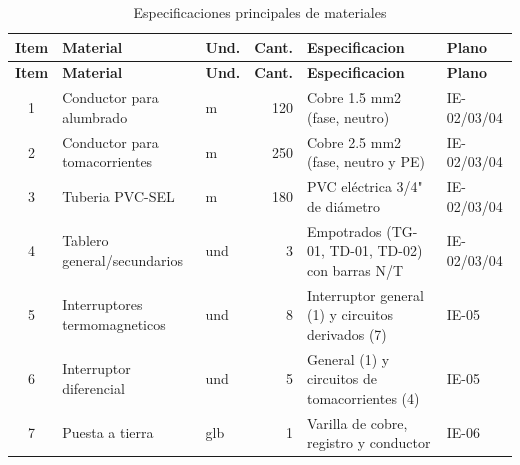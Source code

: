 \begin{landscape}
{\scriptsize
\setlength{\tabcolsep}{3pt}
\begin{longtable}{c L{3.0cm}L{1.0cm}r L{3.4cm}L{1.4cm}}
\caption{Especificaciones principales de materiales}\label{tab:especificaciones-materiales}\\
\toprule
\textbf{Item} & \textbf{Material} & \textbf{Und.} & \textbf{Cant.} & \textbf{Especificacion} & \textbf{Plano} \\
\midrule
\endfirsthead
\toprule
\textbf{Item} & \textbf{Material} & \textbf{Und.} & \textbf{Cant.} & \textbf{Especificacion} & \textbf{Plano} \\
\midrule
{} & Conductor para alumbrado & m & 120 & Cobre 1.5 mm2 (fase, neutro) & IE-02/03/04 \\
2 & Conductor para tomacorrientes & m & 250 & Cobre 2.5 mm2 (fase, neutro y PE) & IE-02/03/04 \\
3 & Tuberia PVC-SEL & m & 180 & PVC eléctrica 3/4" de diámetro & IE-02/03/04 \\
4 & Tablero general/secundarios & und & 3 & Empotrados (TG-01, TD-01, TD-02) con barras N/T & IE-02/03/04 \\
5 & Interruptores termomagneticos & und & 8 & Interruptor general (1) y circuitos derivados (7) & IE-05 \\
6 & Interruptor diferencial & und & 5 & General (1) y circuitos de tomacorrientes (4) & IE-05 \\
7 & Puesta a tierra & glb & 1 & Varilla de cobre, registro y conductor & IE-06 \\
\bottomrule
\end{longtable}
}
\end{landscape}
